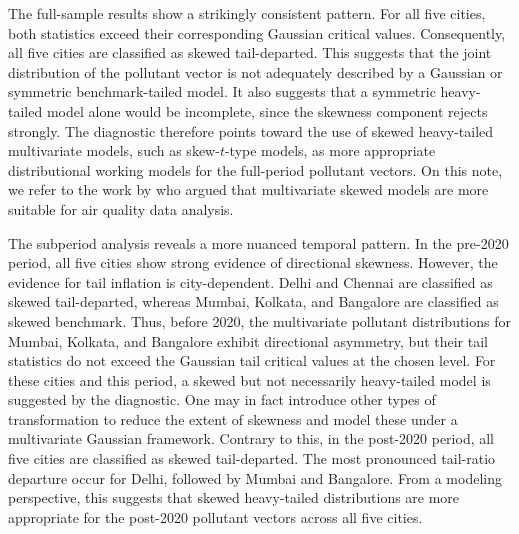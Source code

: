 \documentclass[11pt]{article}
\theoremstyle{plain}
\theoremstyle{definition}
\theoremstyle{remark}
\begin{document}
The full-sample results show a strikingly consistent pattern.  For all five cities, both statistics exceed their corresponding Gaussian critical values.  Consequently, all five cities are classified as skewed tail-departed.  This suggests that the joint distribution of the pollutant vector is not adequately described by a Gaussian or symmetric benchmark-tailed model.  It also suggests that a symmetric heavy-tailed model alone would be incomplete, since the skewness component rejects strongly.  The diagnostic therefore points toward the use of skewed heavy-tailed multivariate models, such as skew-\(t\)-type models, as more appropriate distributional working models for the full-period pollutant vectors. On this note, we refer to the work by \cite{bartoletti2010modelling} who argued that multivariate skewed models are more suitable for air quality data analysis.

The subperiod analysis reveals a more nuanced temporal pattern.  In the pre-2020 period, all five cities show strong evidence of directional skewness.  However, the evidence for tail inflation is city-dependent.  Delhi and Chennai are classified as skewed tail-departed, whereas Mumbai, Kolkata, and Bangalore are classified as skewed benchmark.  Thus, before 2020, the multivariate pollutant distributions for Mumbai, Kolkata, and Bangalore exhibit directional asymmetry, but their tail statistics do not exceed the Gaussian tail critical values at the chosen level.  For these cities and this period, a skewed but not necessarily heavy-tailed model is suggested by the diagnostic. One may in fact introduce other types of transformation to reduce the extent of skewness and model these under a multivariate Gaussian framework. Contrary to this, in the post-2020 period, all five cities are classified as skewed tail-departed. The most pronounced tail-ratio departure occur for Delhi, followed by Mumbai and Bangalore. From a modeling perspective, this suggests that skewed heavy-tailed distributions are more appropriate for the post-2020 pollutant vectors across all five cities.
\end{document}
